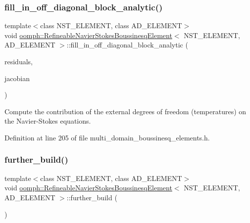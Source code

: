 \subsubsection{\texorpdfstring{fill\+\_\+in\+\_\+off\+\_\+diagonal\+\_\+block\+\_\+analytic()}{fill\_in\_off\_diagonal\_block\_analytic()}}
{\footnotesize\ttfamily template$<$class N\+S\+T\+\_\+\+E\+L\+E\+M\+E\+NT, class A\+D\+\_\+\+E\+L\+E\+M\+E\+NT$>$ \\
void \hyperlink{classoomph_1_1RefineableNavierStokesBoussinesqElement}{oomph\+::\+Refineable\+Navier\+Stokes\+Boussinesq\+Element}$<$ N\+S\+T\+\_\+\+E\+L\+E\+M\+E\+NT, A\+D\+\_\+\+E\+L\+E\+M\+E\+NT $>$\+::fill\+\_\+in\+\_\+off\+\_\+diagonal\+\_\+block\+\_\+analytic (\begin{DoxyParamCaption}\item[{Vector$<$ double $>$ \&}]{residuals,  }\item[{Dense\+Matrix$<$ double $>$ \&}]{jacobian }\end{DoxyParamCaption})\hspace{0.3cm}{\ttfamily [inline]}}



Compute the contribution of the external degrees of freedom (temperatures) on the Navier-\/\+Stokes equations. 



Definition at line 205 of file multi\+\_\+domain\+\_\+boussinesq\+\_\+elements.\+h.

\mbox{\label{classoomph_1_1RefineableNavierStokesBoussinesqElement_a8b7b18f473b0fa9c4127de305e5a6ccc}} 
\subsubsection{\texorpdfstring{further\+\_\+build()}{further\_build()}}
{\footnotesize\ttfamily template$<$class N\+S\+T\+\_\+\+E\+L\+E\+M\+E\+NT, class A\+D\+\_\+\+E\+L\+E\+M\+E\+NT$>$ \\
void \hyperlink{classoomph_1_1RefineableNavierStokesBoussinesqElement}{oomph\+::\+Refineable\+Navier\+Stokes\+Boussinesq\+Element}$<$ N\+S\+T\+\_\+\+E\+L\+E\+M\+E\+NT, A\+D\+\_\+\+E\+L\+E\+M\+E\+NT $>$\+::further\+\_\+build (\begin{DoxyParamCaption}{ }\end{DoxyParamCaption})\hspace{0.3cm}{\ttfamily [inline]}}



